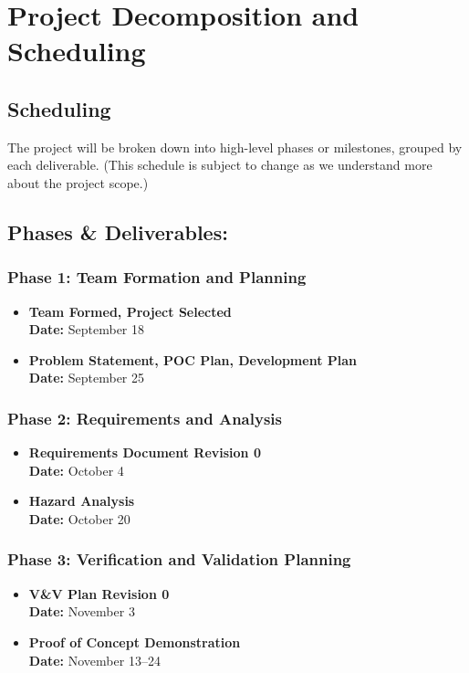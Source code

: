 \documentclass{article}
\begin{document}
\section{Project Decomposition and Scheduling}

\subsection*{Scheduling}
The project will be broken down into high-level phases or milestones, grouped by each deliverable. (This schedule is subject to change as we understand more about the project scope.)

\subsection*{Phases \& Deliverables:}
\subsubsection*{Phase 1: Team Formation and Planning}
\begin{itemize}
    \item \textbf{Team Formed, Project Selected} \\
    \textbf{Date:} September 18
    \item \textbf{Problem Statement, POC Plan, Development Plan} \\
    \textbf{Date:} September 25
\end{itemize}

\subsubsection*{Phase 2: Requirements and Analysis}
\begin{itemize}
    \item \textbf{Requirements Document Revision 0} \\
    \textbf{Date:} October 4
    \item \textbf{Hazard Analysis} \\
    \textbf{Date:} October 20
\end{itemize}

\subsubsection*{Phase 3: Verification and Validation Planning}
\begin{itemize}
    \item \textbf{V\&V Plan Revision 0} \\
    \textbf{Date:} November 3
    \item \textbf{Proof of Concept Demonstration} \\
    \textbf{Date:} November 13–24
\end{itemize}
\end{document}

